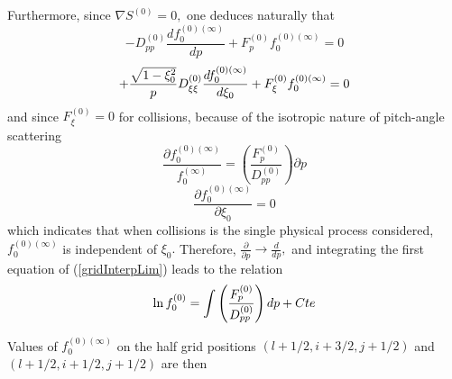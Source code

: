 Furthermore, since $\nabla S^{\left( 0\right) }=0,$ one deduces naturally
that
\begin{equation}
-D_{pp}^{\left( 0\right) }\frac{df_{0}^{\left( 0\right) (\infty )}}{dp}%
+F_{p}^{\left( 0\right) }f_{0}^{\left( 0\right) (\infty )}=0
\end{equation}
\begin{equation}
+\frac{\sqrt{1-\xi _{0}^{2}}}{p}D_{\xi \xi }^{\left( 0\right) }\frac{%
df_{0}^{\left( 0\right) (\infty )}}{d\xi _{0}}+F_{\xi }^{\left( 0\right)
}f_{0}^{\left( 0\right) (\infty )}=0
\end{equation}
and since $F_{\xi }^{\left( 0\right) }=0$ for collisions, because of the
isotropic nature of pitch-angle scattering
\begin{equation}
\frac{\partial f_{0}^{\left( 0\right) (\infty )}}{f_{0}^{(\infty )}}=\left(
\frac{F_{p}^{\left( 0\right) }}{D_{pp}^{\left( 0\right) }}\right) \partial p
\label{gridInterpLim}
\end{equation}
\begin{equation}
\frac{\partial f_{0}^{\left( 0\right) (\infty )}}{\partial \xi _{0}}=0
\end{equation}
which indicates that when collisions is the single physical process
considered, $f_{0}^{\left( 0\right) (\infty )}$ is independent of $\xi _{0}.$
Therefore, $\frac{\partial }{\partial p}\rightarrow \frac{d}{dp},$ and
integrating the first equation of (\ref{gridInterpLim}) leads to the
relation
\begin{equation}
\ln f_{0}^{\left( 0\right) }=\int \left( \frac{F_{p}^{\left( 0\right) }}{%
D_{pp}^{\left( 0\right) }}\right) dp+Cte
\end{equation}

Values of $f_{0}^{\left( 0\right) (\infty )}$ on the half grid positions $%
\left( l+1/2,i+3/2,j+1/2\right) $ and $\left( l+1/2,i+1/2,j+1/2\right) $ are
then

